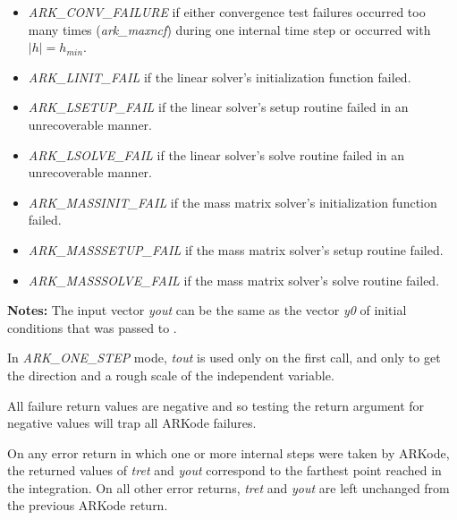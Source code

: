 \documentclass[letterpaper,10pt,english]{sphinxmanual}
\begin{document}
\begin{fulllineitems}
\begin{description}
\begin{itemize}
\item {} 
\emph{ARK\_CONV\_FAILURE} if either convergence test failures occurred
too many times (\emph{ark\_maxncf}) during one internal time step or
occurred with $|h| = h_{min}$.

\item {} 
\emph{ARK\_LINIT\_FAIL} if the linear solver's initialization function failed.

\item {} 
\emph{ARK\_LSETUP\_FAIL} if the linear solver's setup routine failed in
an unrecoverable manner.

\item {} 
\emph{ARK\_LSOLVE\_FAIL} if the linear solver's solve routine failed in
an unrecoverable manner.

\item {} 
\emph{ARK\_MASSINIT\_FAIL} if the mass matrix solver's
initialization function failed.

\item {} 
\emph{ARK\_MASSSETUP\_FAIL} if the mass matrix solver's setup routine
failed.

\item {} 
\emph{ARK\_MASSSOLVE\_FAIL} if the mass matrix solver's solve routine
failed.

\end{itemize}

\end{description}

\textbf{Notes:} The input vector \emph{yout} can be the same as the vector
\emph{y0} of initial conditions that was passed to {\hyperref[c_interface/User_callable:ARKodeInit]{}}.

In \emph{ARK\_ONE\_STEP} mode, \emph{tout} is used only on the first call, and
only to get the direction and a rough scale of the independent
variable.

All failure return values are negative and so testing the return
argument for negative values will trap all ARKode failures.

On any error return in which one or more internal steps were taken
by ARKode, the returned values of \emph{tret} and \emph{yout} correspond to
the farthest point reached in the integration. On all other error
returns, \emph{tret} and \emph{yout} are left unchanged from the previous
ARKode return.

\end{fulllineitems}
\end{document}
